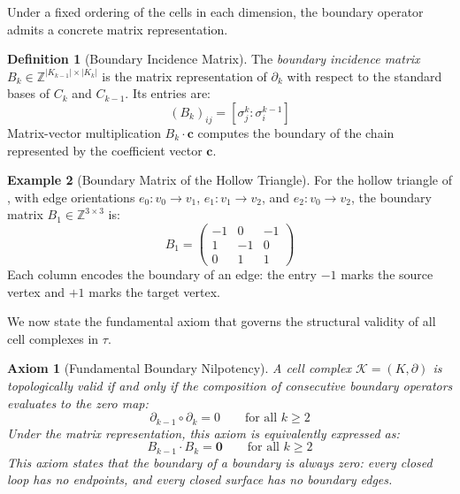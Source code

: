 \documentclass[manuscript, nonacm, review=false]{acmart}
\theoremstyle{definition}
\newtheorem{definition}{Definition}[section]
\newtheorem{example}[definition]{Example}
\theoremstyle{plain}
\newtheorem{axiom}{Axiom}[section]
\newcommand{\Z}{\mathbb{Z}}
\newcommand{\K}{\mathcal{K}}
\newcommand{\toposLang}{\ensuremath{\tau}\text{-Lang}}
\begin{document}
Under a fixed ordering of the cells in each dimension, the boundary operator admits a concrete matrix representation.

\begin{definition}[Boundary Incidence Matrix]
\label{def:incidence_matrix}
The \emph{boundary incidence matrix} $B_k \in \Z^{|K_{k-1}| \times |K_k|}$ is the matrix representation of $\partial_k$ with respect to the standard bases of $C_k$ and $C_{k-1}$. Its entries are:
\begin{equation}
    (B_k)_{ij} = [\sigma_j^k : \sigma_i^{k-1}]
\end{equation}
Matrix-vector multiplication $B_k \cdot \mathbf{c}$ computes the boundary of the chain represented by the coefficient vector $\mathbf{c}$.
\end{definition}

\begin{example}[Boundary Matrix of the Hollow Triangle]
\label{ex:B1_triangle}
For the hollow triangle of , with edge orientations $e_0 : v_0 \to v_1$, $e_1 : v_1 \to v_2$, and $e_2 : v_0 \to v_2$, the boundary matrix $B_1 \in \Z^{3 \times 3}$ is:
\begin{equation}
    B_1 = \begin{pmatrix}
        -1 & 0 & -1 \\
        1 & -1 & 0 \\
        0 & 1 & 1
    \end{pmatrix}
\end{equation}
Each column encodes the boundary of an edge: the entry $-1$ marks the source vertex and $+1$ marks the target vertex.
\end{example}

We now state the fundamental axiom that governs the structural validity of all cell complexes in \toposLang{}.

\begin{axiom}[Fundamental Boundary Nilpotency]
\label{ax:nilpotency}
A cell complex $\K = (K, \partial)$ is \emph{topologically valid} if and only if the composition of consecutive boundary operators evaluates to the zero map:
\begin{equation}
    \partial_{k-1} \circ \partial_k = 0 \qquad \text{for all } k \geq 2
    \label{eq:nilpotency}
\end{equation}
Under the matrix representation, this axiom is equivalently expressed as:
\begin{equation}
    B_{k-1} \cdot B_k = \mathbf{0} \qquad \text{for all } k \geq 2
    \label{eq:nilpotency_matrix}
\end{equation}
This axiom states that the boundary of a boundary is always zero: every closed loop has no endpoints, and every closed surface has no boundary edges.
\end{axiom}
\end{document}
